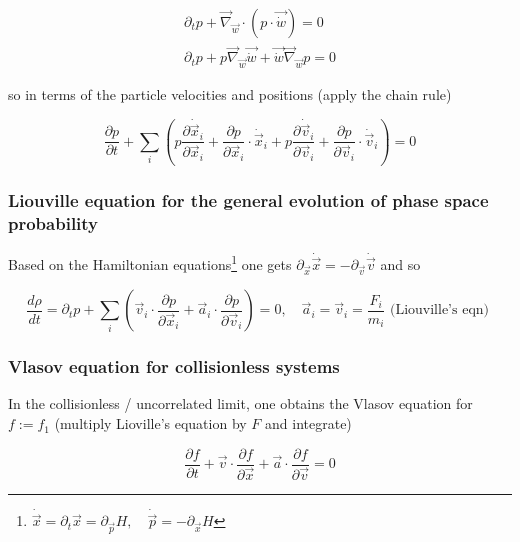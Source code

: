 \begin{equation}
    \begin{gathered}
        \partial_t p+\vec{\nabla}_{\vec{w}} \cdot(p \cdot \vec{\dot{w}})=0 \\
        \partial_t p+p \vec{\nabla}_{\vec{w}} \vec{\dot{w}}+\vec{\dot{w}} \vec{\nabla}_{\vec{w}} p=0
    \end{gathered}
\end{equation}

so in terms of the particle velocities and positions (apply the chain rule)

\begin{equation}
    \frac{\partial p}{\partial t}+\sum_i\left(p \frac{\partial \dot{\vec{x}}_i}{\partial \vec{x}_i}+\frac{\partial p}{\partial \vec{x}_i} \cdot \dot{\vec{x}}_i+p \frac{\partial \dot{\vec{v}}_i}{\partial \vec{v}_i}+\frac{\partial p}{\partial \vec{v}_i} \cdot \dot{\vec{v}}_i\right)=0
\end{equation}

\subsubsection{Liouville equation for the general evolution of phase space probability}

Based on the Hamiltonian equations\footnote{$\dot{\vec{x}} = \partial_t \vec{x} = \partial_\vec{p} H, \quad \dot{\vec{p}} = -\partial_\vec{x} H$}
one gets $\partial_\vec{x} \dot{\vec{x}} = - \partial_\vec{v} \dot{\vec{v}}$ and so

\begin{equation}
    \frac{d \rho}{d t}=\partial_t p+\sum_i\left(\vec{v}_i \cdot \frac{\partial p}{\partial \vec{x}_i}+\vec{a}_i \cdot \frac{\partial p}{\partial \vec{v}_i}\right)=0, \quad \vec{a}_i=\vec{v}_i=\frac{F_i}{m_i} \text { (Liouville's eqn) }
\end{equation}

\subsubsection{Vlasov equation for collisionless systems}
In the collisionless / uncorrelated limit, one obtains the Vlasov equation
for $f := f_1$ (multiply Lioville's equation by $F$ and integrate)

\begin{equation}
    \frac{\partial f}{\partial t}+\vec{v} \cdot \frac{\partial f}{\partial \vec{x}}+\vec{a} \cdot \frac{\partial f}{\partial \vec{v}}=0
\end{equation}

